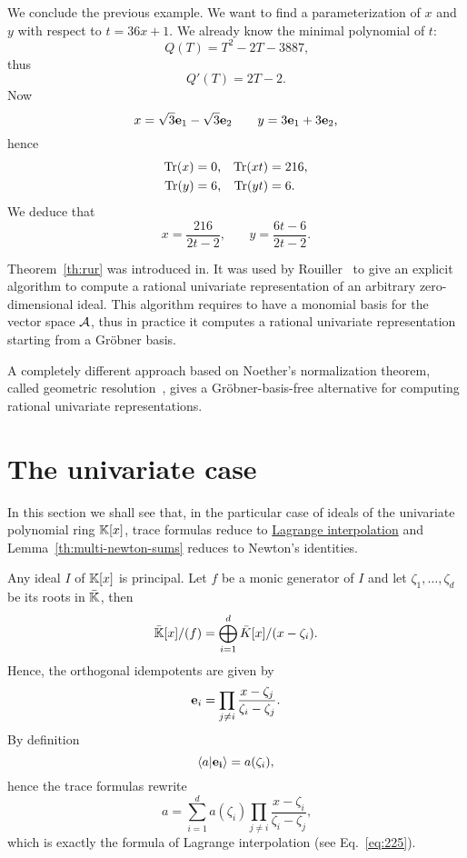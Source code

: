 \begin{example}
  We conclude the previous example. We want to find a parameterization
  of $x$ and $y$ with respect to $t=36x+1$. We already know the
  minimal polynomial of $t$:
  \[Q(T) = T^2-2T-3887\text{,}\]
  thus
  \[Q'(T) = 2T-2\text{.}\]
  Now
  \[x=\sqrt{3}\mathbf{e}_1 -\sqrt{3}\mathbf{e}_2 \qquad
  y = 3\mathbf{e}_1 + 3\mathbf{e}_2\text{,}\]
  hence 
  \begin{align*}
    \operatorname{Tr}(x) &= 0\text{,} & \operatorname{Tr}(xt) &= 216\text{,}\\
    \operatorname{Tr}(y) &= 6\text{,} & \operatorname{Tr}(yt) &= 6\text{.}
  \end{align*}
  We deduce that
  \[x=\frac{216}{2t-2}\text{,}\qquad
  y=\frac{6t-6}{2t-2}\text{.}\]
\end{example}

\begin{nota}
  Theorem~\ref{th:rur} was introduced
  in\cite{alonso+becker+roy+wormann}. It was used by
  Rouiller~\cite{rouiller99} to give an explicit algorithm to compute
  a rational univariate representation of an arbitrary
  zero-dimensional ideal. This algorithm requires to have a monomial
  basis for the vector space $\mathcal{A}$, thus in practice it computes
  a rational univariate representation starting from a Gröbner basis.

  A completely different approach based on Noether's normalization
  theorem, called geometric resolution~\cite{giusti+lecerf+salvy01},
  gives a Gröbner-basis-free alternative for computing rational
  univariate representations.
\end{nota}


\section{The univariate case}
\label{sec:univariate-case}
In this section we shall see that, in the particular case of ideals of
the univariate polynomial ring $\mathbb{K}[x]$, trace formulas reduce to
\hyperref[sec:chin-rema-algor]{Lagrange interpolation} and
Lemma~\ref{th:multi-newton-sums} reduces to Newton's identities.

Any ideal $I$ of $\mathbb{K}[x]$ is principal. Let $f$ be a monic generator of
$I$ and let $\zeta_1,\ldots,\zeta_d$ be its roots in $\bar{\mathbb{K}}$, then
\begin{equation}
  \label{eq:20}
  \bar{\mathbb{K}}[x]/(f) = \bigoplus_{i=1}^d \bar{K}[x]/(x-\zeta_i)
  \text{.}
\end{equation}
Hence, the orthogonal idempotents are given by
\begin{equation}
  \label{eq:29}
  \mathbf{e}_i = \prod_{j\ne i}\frac{x-\zeta_j}{\zeta_i-\zeta_j}
  \text{.}
\end{equation}
By definition
\begin{equation}
  \label{eq:31}
  \left\langle a \middle| \mathbf{e_i} \right\rangle = a(\zeta_i)
  \text{,}
\end{equation}
hence the trace formulas rewrite
\begin{equation}
  \label{eq:35}
  a = \sum_{i=1}^d a(\zeta_i)\prod_{j\ne i}\frac{x-\zeta_i}{\zeta_i-\zeta_j}
  \text{,}
\end{equation}
which is exactly the formula of Lagrange interpolation (see
Eq.~\eqref{eq:225}).

